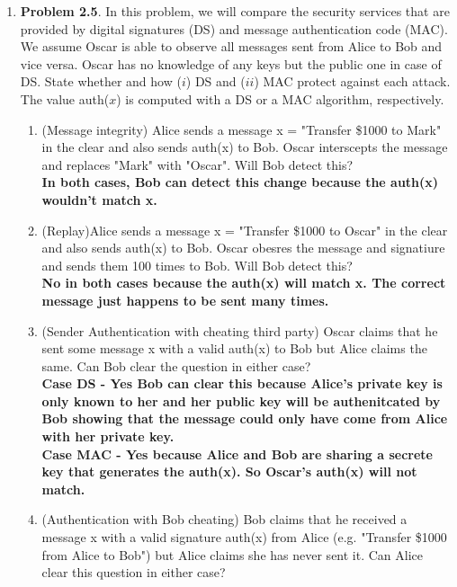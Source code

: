 \documentclass[12pt]{article}
\begin{document}
\begin{enumerate}
\begin{enumerate}
\end{enumerate}
\vspace{30pt}
\item {\textbf{Problem 2.5}. In this problem, we will compare the security services that are provided by digital signatures (DS) and message authentication code (MAC). We assume Oscar is able to observe all messages sent from Alice to Bob and vice versa. Oscar has no knowledge of any keys but the public one in case of DS. State whether and how ($i$) DS and ($ii$) MAC protect against each attack. The value auth($x$) is computed with a DS or a MAC algorithm, respectively.}
\begin{enumerate}
\item (Message integrity) Alice sends a message x = "Transfer \$1000 to Mark" in the clear and also sends auth(x) to Bob. Oscar interscepts the message and replaces "Mark" with "Oscar". Will Bob detect this? \\

\textbf{In both cases, Bob can detect this change because the auth(x) wouldn't match x.}

\item (Replay)Alice sends a message x = "Transfer \$1000 to Oscar" in the clear and also sends auth(x) to Bob. Oscar obesres the message and signatiure and sends them 100 times to Bob. Will Bob detect this? \\

\textbf{No in both cases because the auth(x) will match x. The correct message just happens to be sent many times.}

\item (Sender Authentication with cheating third party) Oscar claims that he sent some message x with a valid auth(x) to Bob but Alice claims the same. Can Bob clear the question in either case? \\

\textbf{Case DS - Yes Bob can clear this because Alice's private key is only known to her and her public key will be authenitcated by Bob showing that the message could only have come from Alice with her private key.} \\
\textbf{Case MAC - Yes because Alice and Bob are sharing a secrete key that generates the auth(x). So Oscar's auth(x) will not match.}

\item (Authentication with Bob cheating) Bob claims that he received a message x with a valid signature auth(x) from Alice (e.g. "Transfer \$1000 from Alice to Bob") but Alice claims she has never sent it. Can Alice clear this question in either case?\\


\end{enumerate}
\end{enumerate}
\end{document}
